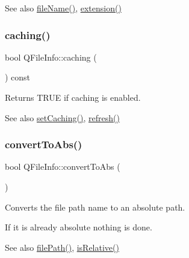 \begin{DoxySeeAlso}{See also}
\mbox{\hyperlink{class_q_file_info_a4f6795e14c6dc89e4a54d7b5cad9d03f}{file\+Name()}}, \mbox{\hyperlink{class_q_file_info_aea9896c7746e79f76b66b1bd71631520}{extension()}} 
\end{DoxySeeAlso}
\mbox{\label{class_q_file_info_adf5d4a3e1c616dde6d932eaa9d7bce91}} 
\subsubsection{\texorpdfstring{caching()}{caching()}}
{\footnotesize\ttfamily bool Q\+File\+Info\+::caching (\begin{DoxyParamCaption}{ }\end{DoxyParamCaption}) const\hspace{0.3cm}{\ttfamily [inline]}}

Returns T\+R\+UE if caching is enabled. \begin{DoxySeeAlso}{See also}
\mbox{\hyperlink{class_q_file_info_a9f2d5de0b83ff0c42b0004574ec9ddf5}{set\+Caching()}}, \mbox{\hyperlink{class_q_file_info_a2e046cd4da1f8804c9f39e05921232c5}{refresh()}} 
\end{DoxySeeAlso}
\mbox{\label{class_q_file_info_a3a4b0328b3fd423e0cfb0747445760b8}} 
\subsubsection{\texorpdfstring{convertToAbs()}{convertToAbs()}}
{\footnotesize\ttfamily bool Q\+File\+Info\+::convert\+To\+Abs (\begin{DoxyParamCaption}{ }\end{DoxyParamCaption})}

Converts the file path name to an absolute path.

If it is already absolute nothing is done.

\begin{DoxySeeAlso}{See also}
\mbox{\hyperlink{class_q_file_info_af3dc855c31853287a4f4a17a18d68bc2}{file\+Path()}}, \mbox{\hyperlink{class_q_file_info_ae1b2d0ad6ca05510092d0182e276a5d0}{is\+Relative()}} 
\end{DoxySeeAlso}
\mbox{\label{class_q_file_info_ac3d8f896db959c0688ae38500c3712f3}} 
